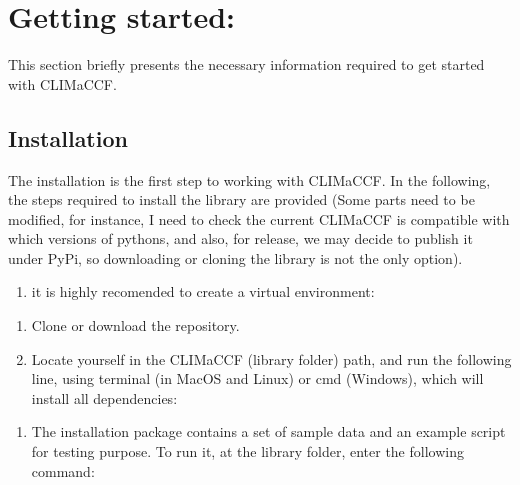 \documentclass[a4paper,11pt,english]{sphinxmanual}
\begin{document}
\chapter{Getting started:}
\label{\detokenize{index:getting-started}}
This section briefly presents the necessary information required to get started with CLIMaCCF.


\section{Installation}
\label{\detokenize{gStarted:installation}}\label{\detokenize{gStarted::doc}}
The installation is the first step to working with CLIMaCCF. In the following, the steps required to install the library are provided (Some parts need to be modified,
for instance, I need to check the current CLIMaCCF is compatible with which versions of pythons, and also, for release, we may decide to publish it under
PyPi, so downloading or cloning the library is not the only option).
\begin{enumerate}
%
\setcounter{enumi}{-1}
\item {} 
it is highly recomended to create a virtual environment:

\end{enumerate}

\begin{sphinxVerbatim}[commandchars=\\\{\}]
   
  
\end{sphinxVerbatim}
\begin{enumerate}
%
\item {} 
Clone or download the repository.

\item {} 
Locate yourself in the CLIMaCCF (library folder) path, and run the following line, using terminal (in MacOS and Linux) or cmd (Windows), which will install all dependencies:

\end{enumerate}

\begin{sphinxVerbatim}[commandchars=\\\{\}]
  
\end{sphinxVerbatim}
\begin{enumerate}
%
\setcounter{enumi}{2}
\item {} 
The installation package contains a set of sample data and an example script for testing purpose. To run it, at the library folder, enter the following command:

\end{enumerate}
\end{document}
